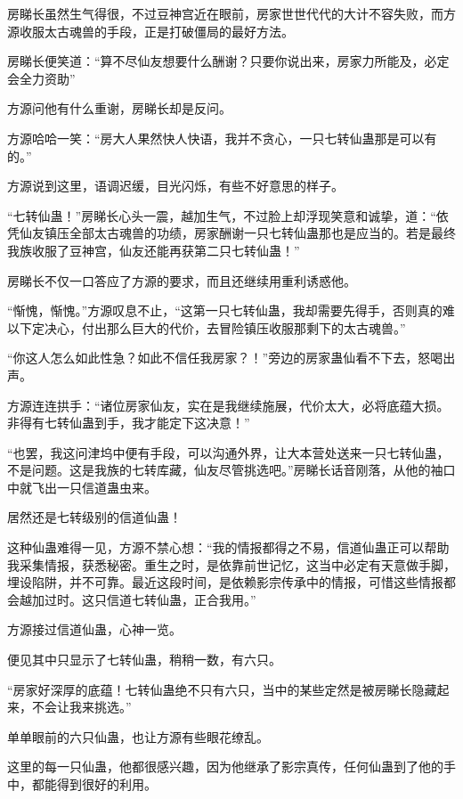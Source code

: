 
\begin{this_body}



房睇长虽然生气得很，不过豆神宫近在眼前，房家世世代代的大计不容失败，而方源收服太古魂兽的手段，正是打破僵局的最好方法。

房睇长便笑道：“算不尽仙友想要什么酬谢？只要你说出来，房家力所能及，必定会全力资助”

方源问他有什么重谢，房睇长却是反问。

方源哈哈一笑：“房大人果然快人快语，我并不贪心，一只七转仙蛊那是可以有的。”

方源说到这里，语调迟缓，目光闪烁，有些不好意思的样子。

“七转仙蛊！”房睇长心头一震，越加生气，不过脸上却浮现笑意和诚挚，道：“依凭仙友镇压全部太古魂兽的功绩，房家酬谢一只七转仙蛊那也是应当的。若是最终我族收服了豆神宫，仙友还能再获第二只七转仙蛊！”

房睇长不仅一口答应了方源的要求，而且还继续用重利诱惑他。

“惭愧，惭愧。”方源叹息不止，“这第一只七转仙蛊，我却需要先得手，否则真的难以下定决心，付出那么巨大的代价，去冒险镇压收服那剩下的太古魂兽。”

“你这人怎么如此性急？如此不信任我房家？！”旁边的房家蛊仙看不下去，怒喝出声。

方源连连拱手：“诸位房家仙友，实在是我继续施展，代价太大，必将底蕴大损。非得有七转仙蛊到手，我才能定下这决意！”

“也罢，我这问津坞中便有手段，可以沟通外界，让大本营处送来一只七转仙蛊，不是问题。这是我族的七转库藏，仙友尽管挑选吧。”房睇长话音刚落，从他的袖口中就飞出一只信道蛊虫来。

居然还是七转级别的信道仙蛊！

这种仙蛊难得一见，方源不禁心想：“我的情报都得之不易，信道仙蛊正可以帮助我采集情报，获悉秘密。重生之时，是依靠前世记忆，这当中必定有天意做手脚，埋设陷阱，并不可靠。最近这段时间，是依赖影宗传承中的情报，可惜这些情报都会越加过时。这只信道七转仙蛊，正合我用。”

方源接过信道仙蛊，心神一览。

便见其中只显示了七转仙蛊，稍稍一数，有六只。

“房家好深厚的底蕴！七转仙蛊绝不只有六只，当中的某些定然是被房睇长隐藏起来，不会让我来挑选。”

单单眼前的六只仙蛊，也让方源有些眼花缭乱。

这里的每一只仙蛊，他都很感兴趣，因为他继承了影宗真传，任何仙蛊到了他的手中，都能得到很好的利用。


\end{this_body}
